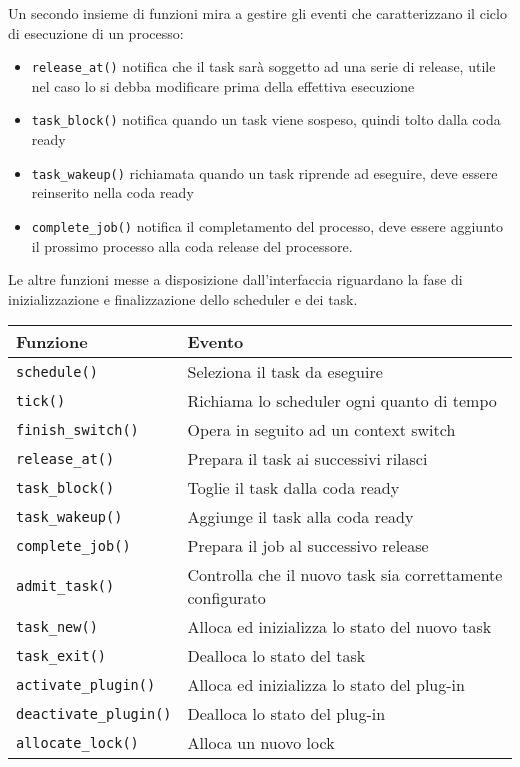 \begin{appendices}
\noindent Un secondo insieme di funzioni mira a gestire gli eventi che caratterizzano il ciclo di esecuzione di un processo:\\

\begin{itemize}
	\item \texttt{release\_at()} notifica che il task sarà soggetto ad una serie di release, utile nel caso lo si debba modificare prima della effettiva esecuzione
	\item \texttt{task\_block()} notifica quando un task viene sospeso, quindi tolto dalla coda ready
	\item \texttt{task\_wakeup()} richiamata quando un task riprende ad eseguire, deve essere reinserito nella coda ready
	\item \texttt{complete\_job()} notifica il completamento del processo, deve essere aggiunto il prossimo processo alla coda release del processore.\\
\end{itemize}

\noindent Le altre funzioni messe a disposizione dall'interfaccia riguardano la fase di inizializzazione e finalizzazione dello scheduler e dei task.\\

\begin{table}
  \centering
  \begin{tabular}{|ll|}
	\hline
	    Funzione & Evento \\ \hline \hline
	   
\texttt{schedule()} 			&	Seleziona il task da eseguire \\
\texttt{tick()} 				&	Richiama lo scheduler ogni quanto di tempo \\
\texttt{finish\_switch()}		&	Opera in seguito ad un context switch \\
\hline
\texttt{release\_at()}			&	Prepara il task ai successivi rilasci \\
\texttt{task\_block()}			&	Toglie il task dalla coda ready \\
\texttt{task\_wakeup()}			&	Aggiunge il task alla coda ready \\
\texttt{complete\_job()}		&	Prepara il job al successivo release \\
\hline
\texttt{admit\_task()}			&	Controlla che il nuovo task sia correttamente configurato \\
\texttt{task\_new()}			&	Alloca ed inizializza lo stato del nuovo task \\
\texttt{task\_exit()}			&	Dealloca lo stato del task \\
\hline
\texttt{activate\_plugin()}		&	Alloca ed inizializza lo stato del plug-in \\
\texttt{deactivate\_plugin()}	&	Dealloca lo stato del plug-in \\
\hline
\texttt{allocate\_lock()}		&	Alloca un nuovo lock \\
  	

\end{tabular}
\end{table}
\end{appendices}
